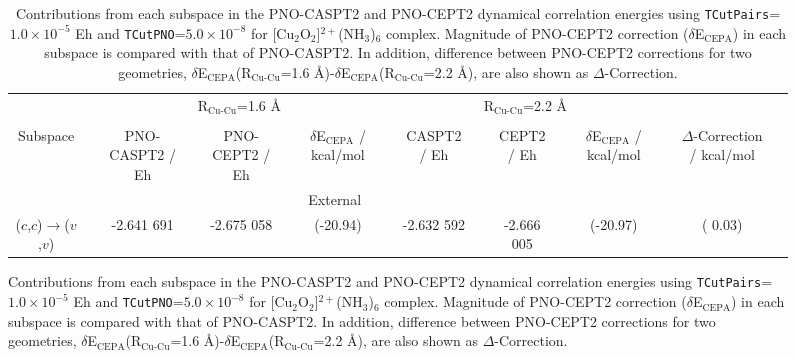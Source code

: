 \documentclass[aip,jcp,amsmath]{revtex4-1}
\begin{document}
%
%
%

{
\squeezetable
\begin{figure}    
\begin{longtable}[!ht]{cccccccccccccccc}
  \caption{\label{tab:cu2o2-analysis}
    Contributions from each subspace in the PNO-CASPT2 and PNO-CEPT2 dynamical correlation energies using {\tt TCutPairs}=$1.0\times 10^{-5}$ Eh and {\tt TCutPNO}=$5.0\times 10^{-8}$ for [Cu${}_2$O${}_2$]${}^{2+}$(NH${}_3$)${}_{6}$ complex.
    Magnitude of PNO-CEPT2 correction ($\delta$E${}_\text{CEPA}$) in each subspace is compared with that of PNO-CASPT2.
    In addition, difference between PNO-CEPT2 corrections for two geometries, $\delta$E${}_\text{CEPA}$(R${}_\text{Cu-Cu}$=1.6 \AA)-$\delta$E${}_\text{CEPA}$(R${}_\text{Cu-Cu}$=2.2 \AA), are also shown as $\Delta$-Correction.
}
  \\
\hline  
\hline
 {}                                                               && \multicolumn{5}{c}{R${}_\text{Cu-Cu}$=1.6 \AA} && \multicolumn{5}{c}{R${}_\text{Cu-Cu}$=2.2 \AA} \\
\cline{3-14} \\      
 Subspace                                                         && PNO-CASPT2 / Eh && PNO-CEPT2 / Eh && $\delta$E${}_\text{CEPA}$ / kcal/mol && CASPT2 / Eh && CEPT2 / Eh && $\delta$E${}_\text{CEPA}$ / kcal/mol && $\Delta$-Correction / kcal/mol \\
\hline
                                                                  && \multicolumn{10}{c}{External} \\
($c$,$c$)$\rightarrow$($v$,$v$)                                   && -2.641 691  && -2.675 058  && (-20.94)  && -2.632 592  && -2.666 005  && (-20.97) && (  0.03)\\

\end{longtable}
\end{figure}}
\end{document}
